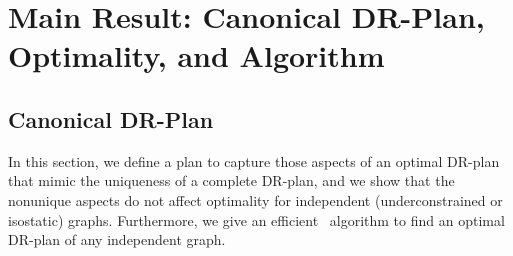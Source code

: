 \newcommand{\drpx}[1]{P_{#1}}
\newcommand{\comdrpx}[1]{P_{#1}^{com}}
\newcommand{\candrpx}[1]{P_{#1}^{can}}
\newcommand{\seqdrpx}[1]{P_{#1}^{seq}}

\newcommand{\componentsx}[1]{\textsc{Components}(#1)}

\newcommand{\Branch}{Branch}
\newcommand{\branch}{branch}
\newcommand{\branches}{branches}

\newcommand{\branchx}[1]{\textsc{Branch}(#1)}
\newcommand{\branchGePG}{$\branchx{G,e,P_G}$}
\newcommand{\branchLfPL}{$\branchx{L,f,P_L}$}



\section{Main Result: Canonical DR-Plan, Optimality, and Algorithm}
\label{sec:DRP}



\subsection{Canonical DR-Plan}
In this section, we define a  plan to capture those aspects of an optimal DR-plan that mimic the  uniqueness of a complete DR-plan, and we show that the nonunique aspects do not affect optimality for independent (underconstrained or isostatic) graphs. Furthermore, we give an efficient \ComplexityCanDRP\ algorithm to find an optimal DR-plan of any independent graph.

